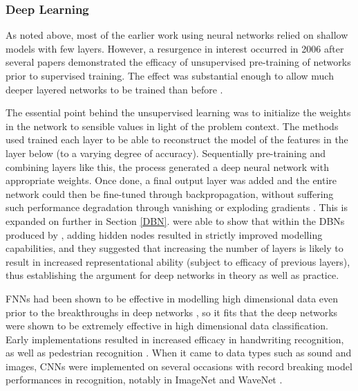 \documentclass[a4paper,11pt,oneside]{article}
\theoremstyle{plain}
\theoremstyle{definition}
\begin{document}
	\subsubsection{Deep Learning}
	
	As noted above, most of the earlier work using neural networks relied on shallow models with few layers. 
	However, a resurgence in interest occurred in 2006 after several papers demonstrated the efficacy of 
	unsupervised pre-training of networks prior to supervised training. The effect was substantial enough to allow 
	much deeper layered networks to be trained than before \citep{Bengio1, Hinton1}.
	\hfill \break 
	
	The essential point behind the unsupervised learning was to initialize the weights in the network to sensible 
	values in light of the problem context. The methods used trained each layer to be able to reconstruct the model 
	of the features in the layer below (to a varying degree of accuracy). Sequentially pre-training and combining 
	layers like this, the process generated a deep neural network with appropriate weights. Once done, a final output 
	layer was added and the entire network could then be fine-tuned through backpropagation, without suffering 
	such performance degradation through vanishing or exploding gradients \citep{Hinton1, Ranzato1, Hinton2}. This is 
	expanded on further in Section \ref{DBN}. \citet{LeRoux} were able to show that within the DBNs produced by 
	\citet{Hinton1}, adding hidden nodes resulted in strictly improved modelling capabilities, and they suggested 
	that increasing the number of layers is likely to result in increased representational ability (subject to efficacy of 
	previous layers), thus establishing the argument for deep networks in theory as well as practice.
	\hfill \break 
	
	FNNs had been shown to be effective in modelling high dimensional data even prior to the breakthroughs in 
	deep networks \citep{Bengio2}, so it fits that the deep networks were shown to be extremely effective in high dimensional 
	data classification. Early implementations resulted in increased efficacy in handwriting recognition, as well as pedestrian 
	recognition \citep{Sermanet}. When it came to data types such as sound and images, CNNs were implemented on several 
	occasions with record breaking model performances in recognition, notably in ImageNet and WaveNet \citep{ImageNet, WaveNet}.
	\hfill \break 
	
\end{document}
